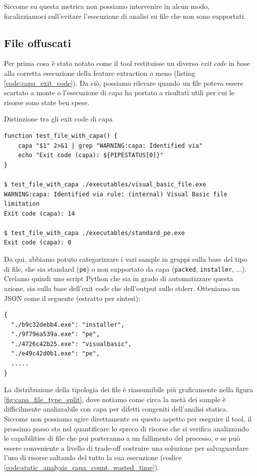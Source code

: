 Siccome su questa metrica non possiamo intervenire in alcun modo, focalizziamoci sull'evitare l'esecuzione di analisi su file che non sono supportati.


\subsection{File offuscati}
\label{chap:static_analysis_obfuscated}
Per prima cosa è stato notato come il tool restituisse un diverso \emph{exit code} in base alla corretta esecuzione della feature extraction o meno (listing \ref{code:capa_exit_code}). Da ciò, possiamo rilevare quando un file poteva essere scartato a monte o l'esecuzione di capa ha portato a risultati utili per cui le risorse sono state ben spese.

\begin{code}
\caption{Distinzione tra gli exit code di capa}
\begin{verbatim}
function test_file_with_capa() {
    capa "$1" 2>&1 | grep "WARNING:capa: Identified via"
    echo "Exit code (capa): ${PIPESTATUS[0]}"
}

$ test_file_with_capa ./executables/visual_basic_file.exe
WARNING:capa: Identified via rule: (internal) Visual Basic file limitation
Exit code (capa): 14

$ test_file_with_capa ./executables/standard_pe.exe
Exit code (capa): 0
\end{verbatim}
\label{code:capa_exit_code}
\end{code}

Da qui, abbiamo potuto categorizzare i vari sample in gruppi sulla base del tipo di file, che sia standard (\texttt{pe}) o non supportato da capa (\texttt{packed}, \texttt{installer}, ...).
Creiamo quindi uno script Python che sia in grado di automatizzare questa azione, sia sulla base dell'exit code che dell'output sullo stderr. Otteniamo un JSON come il seguente (estratto per sintesi):

\begin{verbatim}
{
  "./b9c32debb4.exe": "installer",
  "./9f79ea539a.exe": "pe",
  "./4726c42b25.exe": "visualbasic",
  "./e49c42d0b1.exe": "pe",
  .....
}
\end{verbatim}

La distribuzione della tipologia dei file è riassumibile più graficamente nella figura \ref{fig:capa_file_type_split}, dove notiamo come circa la metà dei sample è difficilmente analizzabile con capa per difetti congeniti dell'analisi statica.
Siccome non possiamo agire direttamente su questo aspetto per eseguire il tool, il prossimo passo sta nel quantificare lo spreco di risorse che si verifica analizzando le capabilities di file che poi porteranno a un fallimento del processo, e se può essere conveniente a livello di trade-off costruire una soluzione per salvaguardare l'uso di risorse saltando del tutto la sua esecuzione (codice \ref{code:static_analysis_capa_count_wasted_time}).

